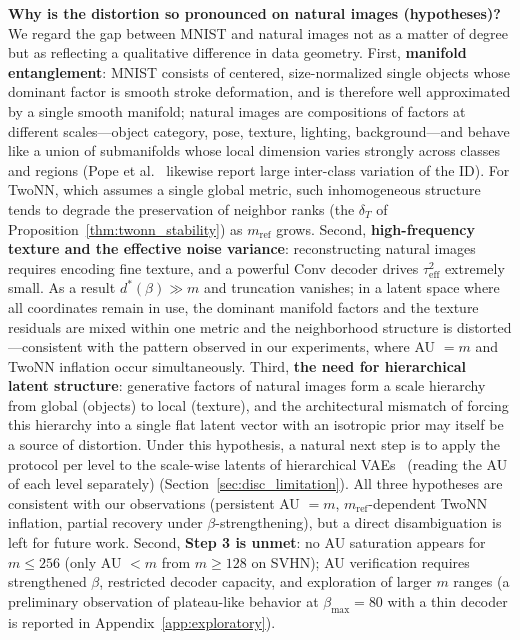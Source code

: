 \documentclass[make,article,submit,pdftex,moreauthors]{Definitions/mdpi}
\newcommand{\dstar}{d^{*}(\beta)}
\begin{document}
\textbf{Why is the distortion so pronounced on natural images
(hypotheses)?}
We regard the gap between MNIST and natural images not as a matter of
degree but as reflecting a qualitative difference in data geometry.
First, \textbf{manifold entanglement}: MNIST consists of centered,
size-normalized single objects whose dominant factor is smooth stroke
deformation, and is therefore well approximated by a single smooth
manifold; natural images are compositions of factors at different
scales---object category, pose, texture, lighting, background---and behave
like a union of submanifolds whose local dimension varies strongly across
classes and regions (Pope et al.~\cite{pope2021intrinsic} likewise report
large inter-class variation of the ID).
For TwoNN, which assumes a single global metric, such inhomogeneous
structure tends to degrade the preservation of neighbor ranks (the
$\delta_T$ of Proposition~\ref{thm:twonn_stability}) as $m_{\mathrm{ref}}$
grows.
Second, \textbf{high-frequency texture and the effective noise variance}:
reconstructing natural images requires encoding fine texture, and a
powerful Conv decoder drives $\tau^2_{\mathrm{eff}}$ extremely small.
As a result $\dstar \gg m$ and truncation vanishes; in a latent space where
all coordinates remain in use, the dominant manifold factors and the
texture residuals are mixed within one metric and the neighborhood
structure is distorted---consistent with the pattern observed in our
experiments, where AU $= m$ and TwoNN inflation occur simultaneously.
Third, \textbf{the need for hierarchical latent structure}: generative
factors of natural images form a scale hierarchy from global (objects) to
local (texture), and the architectural mismatch of forcing this hierarchy
into a single flat latent vector with an isotropic prior may itself be a
source of distortion.
Under this hypothesis, a natural next step is to apply the protocol
per level to the scale-wise latents of hierarchical
VAEs~\cite{sonderby2016ladder} (reading the AU of each level separately)
(Section~\ref{sec:disc_limitation}).
All three hypotheses are consistent with our observations (persistent
AU $= m$, $m_{\mathrm{ref}}$-dependent TwoNN inflation, partial recovery
under $\beta$-strengthening), but a direct disambiguation is left for
future work.
Second, \textbf{Step 3 is unmet}: no AU saturation appears for
$m \leq 256$ (only AU $< m$ from $m \geq 128$ on SVHN); AU verification
requires strengthened $\beta$, restricted decoder capacity, and exploration
of larger $m$ ranges (a preliminary observation of plateau-like behavior at
$\beta_{\max} = 80$ with a thin decoder is reported in
Appendix~\ref{app:exploratory}).
\end{document}
